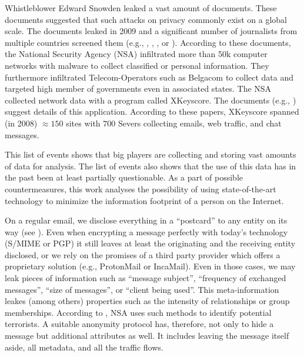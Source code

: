 \documentclass[10pt,journal,compsoc,twocolumn,twoside]{IEEEtran}
\begin{document}
Whistleblower Edward Snowden leaked a vast amount of documents. These documents suggested that such attacks on privacy commonly exist on a global scale. The documents leaked in 2009 and a significant number of journalists from multiple countries screened them (e.g., \cite{NCR2013}, \cite{XKeyscore}, \cite{Ball2013}, \cite{Ackerman2013} or \cite{Greenberg2013}). According to these documents, the National Security Agency (NSA) infiltrated more than 50k computer networks with malware to collect classified or personal information. They furthermore infiltrated Telecom-Operators 
such as Belgacom to collect data and targeted high member of governments even in associated states. 
The NSA collected network data with a program called XKeyscore. The documents (e.g., \cite{XKeyscore}) suggest details of this application. According to these papers, XKeyscore spanned (in 2008) $\approx150$ sites with $700$ Severs collecting emails, web traffic, and chat messages.

This list of events shows that big players are collecting and storing vast amounts of data for analysis. The list of events also shows that the use of this data has in the past been at least partially questionable. As a part of possible countermeasures, this work analyses the possibility of using state-of-the-art technology to minimize the information footprint of a person on the Internet. 

On a regular email, we disclose everything in a ``postcard'' to any entity on its way (see \cite{RFC5321}). Even when encrypting a message perfectly with today's technology (S/MIME\cite{RFC2045} or PGP\cite{RFC2015}) it still leaves at least the originating and the receiving entity disclosed, or we rely on the promises of a third party provider which offers a proprietary solution (e.g., ProtonMail or IncaMail). Even in those cases, we may leak pieces of information such as ``message subject'', ``frequency of exchanged messages'', ``size of messages'', or ``client being used''. This meta-information leakes (among others) properties such as the intensity of relationships or group memberships. 
According to \cite{Ackerman2013}, NSA uses such methods to identify potential terrorists. A suitable anonymity protocol has, therefore, not only to hide a message but additional attributes as well. It includes leaving the message itself aside, all metadata, and all the traffic flows. 
\end{document}
